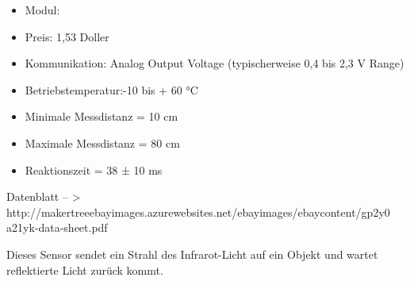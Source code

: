 \begin{itemize}
\item Modul: 
\item Preis: 1,53 Doller
\item Kommunikation: Analog Output Voltage (typischerweise 0,4 bis 2,3 V Range)
\item Betriebstemperatur:-10 bis + 60 °C
\item Minimale Messdistanz = 10 cm
\item Maximale Messdistanz = 80 cm
\item Reaktionszeit = 38 ± 10 ms

\end{itemize}



Datenblatt – > http://makertreeebayimages.azurewebsites.net/ebayimages/ebaycontent/gp2y0 a21yk-data-sheet.pdf
 
 Dieses Sensor sendet ein Strahl des Infrarot-Licht auf ein Objekt und wartet  reflektierte Licht zurück kommt.